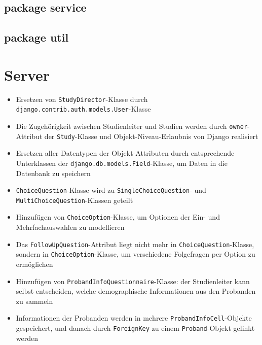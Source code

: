 \documentclass[a4paper]{scrreprt}
\begin{document}
            \subsection{package service}
            \subsection{package util}


        \section{Server}
            \begin{itemize}
                \item Ersetzen von \texttt{StudyDirector}-Klasse durch \texttt{django.contrib.auth.models.User}-Klasse

                \item Die Zugehörigkeit zwischen Studienleiter und Studien werden durch \texttt{owner}-Attribut der \texttt{Study}-Klasse und Objekt-Niveau-Erlaubnis von Django realisiert

                \item Ersetzen aller Datentypen der Objekt-Attributen durch entsprechende Unterklassen der \texttt{django.db.models.Field}-Klasse, um Daten in die Datenbank zu speichern

                \item \texttt{ChoiceQuestion}-Klasse wird zu \texttt{SingleChoiceQuestion}- und \texttt{MultiChoiceQuestion}-Klassen geteilt

                \item Hinzufügen von \texttt{ChoiceOption}-Klasse, um Optionen der Ein- und Mehrfachauswahlen zu modellieren

                \item Das \texttt{FollowUpQuestion}-Attribut liegt nicht mehr in \texttt{ChoiceQuestion}-Klasse, sondern in \texttt{ChoiceOption}-Klasse, um verschiedene Folgefragen per Option zu ermöglichen

                \item Hinzufügen von \texttt{ProbandInfoQuestionnaire}-Klasse: der Studienleiter kann selbst entscheiden, welche demographische Informationen aus den Probanden zu sammeln

                \item Informationen der Probanden werden in mehrere \texttt{ProbandInfoCell}-Objekte gespeichert, und danach durch \texttt{ForeignKey} zu einem \texttt{Proband}-Objekt gelinkt werden


\end{itemize}
\end{document}

